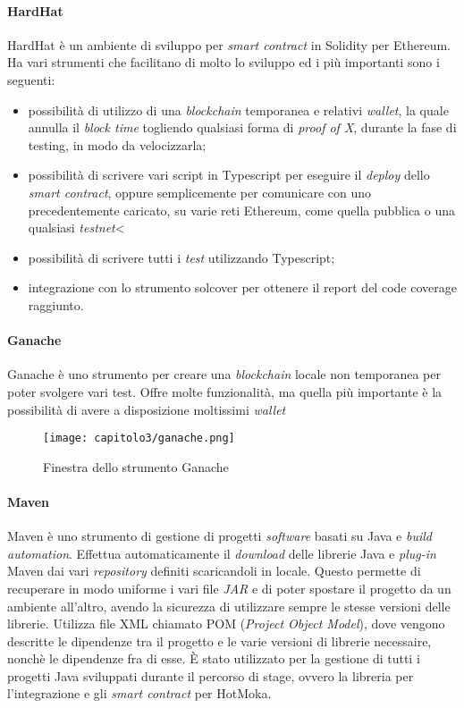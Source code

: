 \paragraph{HardHat}
HardHat è un ambiente di sviluppo per \textit{smart contract} in Solidity per Ethereum. Ha vari strumenti che facilitano di molto lo sviluppo ed i più importanti sono i seguenti:
\begin{itemize}
  \item possibilità di utilizzo di una \textit{blockchain} temporanea e relativi \textit{wallet}, la quale annulla il \textit{block time} togliendo qualsiasi forma di \textit{proof of X}, durante la fase di testing, in modo da velocizzarla;
  \item possibilità di scrivere vari script in Typescript per eseguire il \textit{deploy} dello \textit{smart contract}, oppure semplicemente per comunicare con uno precedentemente caricato, su varie reti Ethereum, come quella pubblica o una qualsiasi \textit{testnet}<
  \item possibilità di scrivere tutti i \textit{test} utilizzando Typescript;
  \item integrazione con lo strumento solcover per ottenere il report del code coverage raggiunto.
\end{itemize}

\paragraph{Ganache}
Ganache è uno strumento per creare una \textit{blockchain} locale non temporanea per poter svolgere vari test. Offre molte funzionalità, ma quella più importante è la possibilità di avere a disposizione moltissimi \textit{wallet}

\begin{figure}[h!]
  \centering
  \texttt{[image: capitolo3/ganache.png]}
  \caption{Finestra dello strumento Ganache}
\end{figure}

\paragraph{Maven}
Maven è uno strumento di gestione di progetti \textit{software} basati su Java e \textit{build automation}. Effettua automaticamente il \textit{download} delle librerie Java e \textit{plug-in} Maven dai vari \textit{repository} definiti scaricandoli in locale. Questo permette di recuperare in modo uniforme i vari file \textit{JAR} e di poter spostare il progetto da un ambiente all'altro, avendo la sicurezza di utilizzare sempre le stesse versioni delle librerie. Utilizza file XML chiamato POM (\textit{Project Object Model}), dove vengono descritte le dipendenze tra il progetto e le varie versioni di librerie necessaire, nonchè le dipendenze fra di esse. È stato utilizzato per la gestione di tutti i progetti Java sviluppati durante il percorso di stage, ovvero la libreria per l'integrazione e gli \textit{smart contract} per HotMoka.

